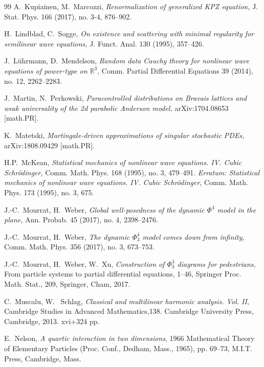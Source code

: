 \documentclass[%
11pt,  reqno]{amsart}
\newcommand{\1}{\hspace{0.2mm}\text{I}\hspace{0.2mm}}
\numberwithin{equation}{section}
\numberwithin{theorem}{section}
\begin{document}
\begin{thebibliography}{99}
A.~Kupiainen,  M.~Marcozzi,
{\it Renormalization of {generalized} {KPZ} {equation},}
J. Stat. Phys. 166 (2017), no. 3-4, 876--902.


H.~Lindblad, C.~Sogge, {\it On existence and scattering with minimal regularity for semilinear wave equations,} J. Funct. Anal. 130 (1995), 357--426.


J.~L\"uhrmann, D.~Mendelson,
{\it Random data Cauchy theory for nonlinear wave equations of power-type on $\mathbb{R}^3$},
 Comm. Partial Differential Equations  39 (2014), no. 12, 2262--2283.

J.~Martin,  N.~Perkowski,
{\it Paracontrolled distributions on {Bravais} lattices and weak
  universality of the 2d parabolic {Anderson} model,}
arXiv:1704.08653 [math.PR].


K.~Matetski,
{\it Martingale-driven approximations of singular stochastic {PDEs},}
arXiv:1808.09429 [math.PR].

H.P.~McKean, 
{\it Statistical mechanics of nonlinear wave equations. IV. Cubic Schr\"odinger,} 
 Comm. Math. Phys. 168 (1995), no. 3, 479--491. 
 {\it Erratum: Statistical mechanics of nonlinear wave equations. IV. Cubic Schr\"odinger}, Comm. Math. Phys. 173 (1995), no. 3, 675.





J.-C.~Mourrat, H.~Weber,
{\it Global well-posedness of the dynamic $\Phi^4$ model in the plane,}
 Ann. Probab. 45 (2017), no. 4, 2398--2476.



J.-C.~Mourrat, H.~Weber,
{\it The dynamic $\Phi^4_3$ model comes down from infinity}, 
Comm. Math. Phys. 356 (2017), no. 3, 673--753.



J.-C.~Mourrat, H.~Weber, W.~Xu,
{\it Construction of $\Phi^4_3$ diagrams for pedestrians,}
 From particle systems to partial differential equations, 1--46, Springer Proc. Math. Stat., 209, Springer, Cham, 2017.

C.~Muscalu, W.~ Schlag,
 {\it Classical and multilinear harmonic analysis. {V}ol. {II}},
 Cambridge Studies in Advanced Mathematics,138. Cambridge University Press, Cambridge, 2013. 
xvi+324 pp. 


E.~Nelson, 
{\it A quartic interaction in two dimensions}, 
 1966 Mathematical Theory of Elementary Particles (Proc. Conf., Dedham, Mass., 1965), pp. 69--73, M.I.T. Press, Cambridge, Mass.







\end{thebibliography}
\end{document}
